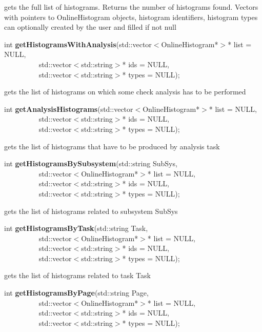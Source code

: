  gets the full list of histograms. Returns the number of histograms found. Vectors with pointers
 to OnlineHistogram objects, histogram identifiers, histogram types can optionally created  by the user
 and filled if not null


\item    int {\bf getHistogramsWithAnalysis}(std::vector$<$OnlineHistogram*$>$* list = NULL,\\\mbox{}~~~~~~~~~
				std::vector$<$std::string$>$* ids = NULL,\\\mbox{}~~~~~~~~~
				std::vector$<$std::string$>$* types = NULL);

 gets the list of histograms on which some check analysis has to be performed 


\item    int {\bf getAnalysisHistograms}(std::vector$<$OnlineHistogram*$>$* list = NULL,\\\mbox{}~~~~~~~~~
			    std::vector$<$std::string$>$* ids = NULL,\\\mbox{}~~~~~~~~~
			    std::vector$<$std::string$>$* types = NULL);

 gets the list of histograms that have to be produced by analysis task


\item    int {\bf getHistogramsBySubsystem}(std::string SubSys,\\\mbox{}~~~~~~~~~
			       std::vector$<$OnlineHistogram*$>$* list = NULL,\\\mbox{}~~~~~~~~~
			       std::vector$<$std::string$>$* ids = NULL,\\\mbox{}~~~~~~~~~
			       std::vector$<$std::string$>$* types = NULL);

 gets the list of histograms related to subsystem SubSys


\item    int {\bf getHistogramsByTask}(std::string Task,\\\mbox{}~~~~~~~~~
			  std::vector$<$OnlineHistogram*$>$* list = NULL,\\\mbox{}~~~~~~~~~
			  std::vector$<$std::string$>$* ids = NULL,\\\mbox{}~~~~~~~~~
			  std::vector$<$std::string$>$* types = NULL);

 gets the list of histograms related to task Task


\item    int {\bf getHistogramsByPage}(std::string Page,\\\mbox{}~~~~~~~~~
			  std::vector$<$OnlineHistogram*$>$* list = NULL,\\\mbox{}~~~~~~~~~
			  std::vector$<$std::string$>$* ids = NULL,\\\mbox{}~~~~~~~~~
			  std::vector$<$std::string$>$* types = NULL);

